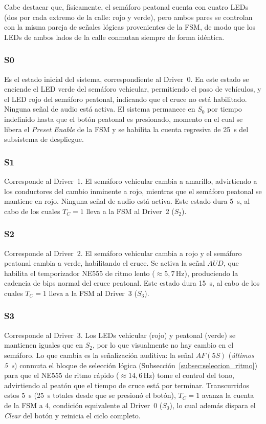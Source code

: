 \documentclass[12pt,onecolumn]{IEEEtran}
\begin{document}
Cabe destacar que, físicamente, el semáforo peatonal cuenta con cuatro LEDs (dos por cada extremo de la calle: rojo y verde), pero ambos pares se controlan con la misma pareja de señales lógicas provenientes de la FSM, de modo que los LEDs de ambos lados de la calle conmutan siempre de forma idéntica.

\subsubsection{S0}

Es el estado inicial del sistema, correspondiente al Driver~0. En este estado se enciende el LED verde del semáforo vehicular, permitiendo el paso de vehículos, y el LED rojo del semáforo peatonal, indicando que el cruce no está habilitado. Ninguna señal de audio está activa. El sistema permanece en $S_0$ por tiempo indefinido hasta que el botón peatonal es presionado, momento en el cual se libera el \textit{Preset Enable} de la FSM y se habilita la cuenta regresiva de 25~s del subsistema de despliegue.

\subsubsection{S1}

Corresponde al Driver~1. El semáforo vehicular cambia a amarillo, advirtiendo a los conductores del cambio inminente a rojo, mientras que el semáforo peatonal se mantiene en rojo. Ninguna señal de audio está activa. Este estado dura 5~s, al cabo de los cuales $T_C = 1$ lleva a la FSM al Driver~2 ($S_2$).

\subsubsection{S2}

Corresponde al Driver~2. El semáforo vehicular cambia a rojo y el semáforo peatonal cambia a verde, habilitando el cruce. Se activa la señal $AUD$, que habilita el temporizador NE555 de ritmo lento ($\approx 5{,}7\,\text{Hz}$), produciendo la cadencia de bips normal del cruce peatonal. Este estado dura 15~s, al cabo de los cuales $T_C = 1$ lleva a la FSM al Driver~3 ($S_3$).

\subsubsection{S3}

Corresponde al Driver~3. Los LEDs vehicular (rojo) y peatonal (verde) se mantienen iguales que en $S_2$, por lo que visualmente no hay cambio en el semáforo. Lo que cambia es la señalización auditiva: la señal $AF(5S)$ (\textit{últimos 5~s}) conmuta el bloque de selección lógica (Subsección~\ref{subsec:seleccion_ritmo}) para que el NE555 de ritmo rápido ($\approx 14{,}6\,\text{Hz}$) tome el control del tono, advirtiendo al peatón que el tiempo de cruce está por terminar. Transcurridos estos 5~s (25~s totales desde que se presionó el botón), $T_C = 1$ avanza la cuenta de la FSM a 4, condición equivalente al Driver~0 ($S_0$), lo cual además dispara el \textit{Clear} del botón y reinicia el ciclo completo.
\end{document}
